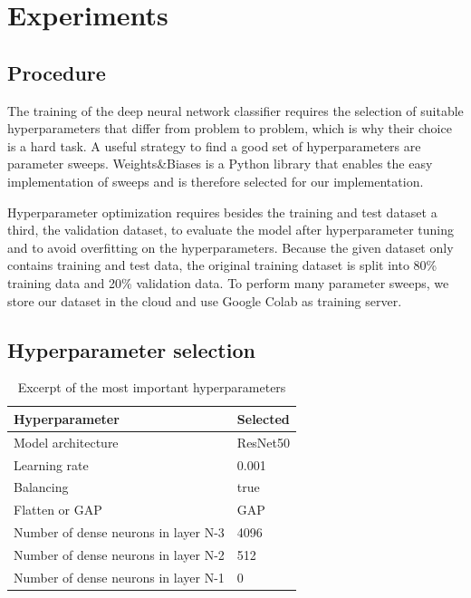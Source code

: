 \documentclass{article}
\begin{document}
\section{Experiments}
\subsection{Procedure}
The training of the deep neural network classifier requires the selection of suitable hyperparameters that differ from
problem to problem, which is why their choice is a hard task. A useful strategy to find a good set of hyperparameters are parameter 
sweeps. Weights\&Biases is a Python library that enables the easy implementation of sweeps and is therefore selected for our implementation. 

Hyperparameter optimization requires besides the training and test dataset a third, the validation dataset, to evaluate the
model after hyperparameter tuning and to avoid overfitting on the hyperparameters. Because the given dataset only contains 
training and test data, the original training dataset is split into 80\% training data and 20\% validation data.
To perform many parameter sweeps, we store our dataset in the cloud and use Google Colab as training server. 

\subsection{Hyperparameter selection}\label{ch_hyperparam}


\renewcommand{\arraystretch}{1.2}
\begin{table}
  \vspace{-20pt}
  \begin{tabular}{|l|l|}
  \hline
  Hyperparameter & Selected\\ \hline \hline
  Model architecture & ResNet50 \\ \hline
  Learning rate & 0.001 \\ \hline
  Balancing & true \\ \hline
  Flatten or GAP & GAP \\ \hline
  Number of dense neurons in layer N-3 & 4096 \\ \hline
  Number of dense neurons in layer N-2 & 512 \\ \hline
  Number of dense neurons in layer N-1 & 0 \\ \hline
  \end{tabular}
  \caption{Excerpt of the most important hyperparameters} \label{tab:hyperparam}
  \end{table}
\end{document}
